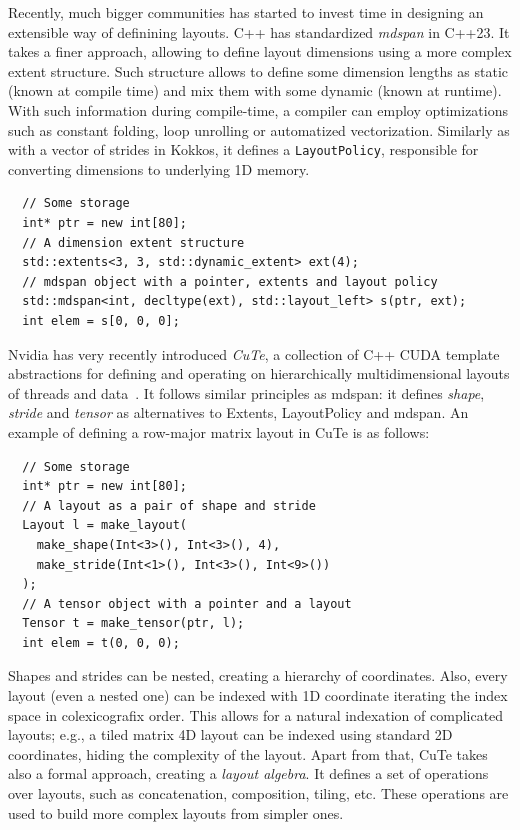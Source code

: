 Recently, much bigger communities has started to invest time in designing an extensible way of definining layouts. C++ has standardized \emph{mdspan} in C++23. It takes a finer approach, allowing to define layout dimensions using a more complex extent structure.  Such structure allows to define some dimension lengths as static (known at compile time) and mix them with some dynamic (known at runtime). With such information during compile-time, a compiler can employ optimizations such as constant folding, loop unrolling or automatized vectorization. Similarly as with a vector of strides in Kokkos, it defines a \texttt{LayoutPolicy}, responsible for converting dimensions to underlying 1D memory. 

\begin{verbatim}
  // Some storage
  int* ptr = new int[80];
  // A dimension extent structure
  std::extents<3, 3, std::dynamic_extent> ext(4);
  // mdspan object with a pointer, extents and layout policy
  std::mdspan<int, decltype(ext), std::layout_left> s(ptr, ext);
  int elem = s[0, 0, 0];
\end{verbatim}

Nvidia has very recently introduced \emph{CuTe}, a collection of C++ CUDA template abstractions for defining and operating on hierarchically multidimensional layouts of threads and data~\cite{cute-online}. It follows similar principles as mdspan: it defines \emph{shape}, \emph{stride} and \emph{tensor} as alternatives to Extents, LayoutPolicy and mdspan. An example of defining a row-major matrix layout in CuTe is as follows:

\begin{verbatim}
  // Some storage
  int* ptr = new int[80];
  // A layout as a pair of shape and stride
  Layout l = make_layout(
    make_shape(Int<3>(), Int<3>(), 4),
    make_stride(Int<1>(), Int<3>(), Int<9>())
  );
  // A tensor object with a pointer and a layout
  Tensor t = make_tensor(ptr, l);
  int elem = t(0, 0, 0);
\end{verbatim}

Shapes and strides can be nested, creating a hierarchy of coordinates. Also, every layout (even a nested one) can be indexed with 1D coordinate iterating the index space in colexicografix order. This allows for a natural indexation of complicated layouts; e.g., a tiled matrix 4D layout can be indexed using standard 2D coordinates, hiding the complexity of the layout. 
Apart from that, CuTe takes also a formal approach, creating a \emph{layout algebra}. It defines a set of operations over layouts, such as concatenation, composition, tiling, etc. These operations are used to build more complex layouts from simpler ones.

